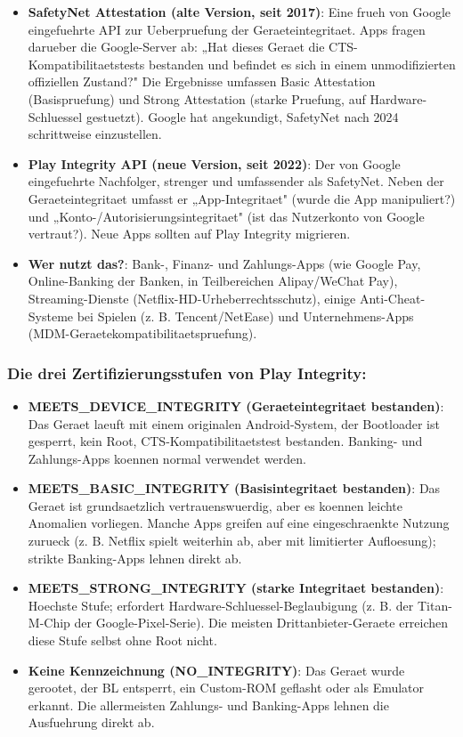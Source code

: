 \begin{itemize}
  \item \textbf{SafetyNet Attestation (alte Version, seit 2017)}: Eine frueh von Google eingefuehrte API zur Ueberpruefung der Geraeteintegritaet. Apps fragen darueber die Google-Server ab: „Hat dieses Geraet die CTS-Kompatibilitaetstests bestanden und befindet es sich in einem unmodifizierten offiziellen Zustand?" Die Ergebnisse umfassen Basic Attestation (Basispruefung) und Strong Attestation (starke Pruefung, auf Hardware-Schluessel gestuetzt). Google hat angekundigt, SafetyNet nach 2024 schrittweise einzustellen.
  \item \textbf{Play Integrity API (neue Version, seit 2022)}: Der von Google eingefuehrte Nachfolger, strenger und umfassender als SafetyNet. Neben der Geraeteintegritaet umfasst er „App-Integritaet" (wurde die App manipuliert?) und „Konto-/Autorisierungsintegritaet" (ist das Nutzerkonto von Google vertraut?). Neue Apps sollten auf Play Integrity migrieren.
  \item \textbf{Wer nutzt das?}: Bank-, Finanz- und Zahlungs-Apps (wie Google Pay, Online-Banking der Banken, in Teilbereichen Alipay/WeChat Pay), Streaming-Dienste (Netflix-HD-Urheberrechtsschutz), einige Anti-Cheat-Systeme bei Spielen (z. B. Tencent/NetEase) und Unternehmens-Apps (MDM-Geraetekompatibilitaetspruefung).
\end{itemize}

\subsubsection*{Die drei Zertifizierungsstufen von Play Integrity:}

\begin{itemize}
  \item \textbf{MEETS\_DEVICE\_INTEGRITY (Geraeteintegritaet bestanden)}: Das Geraet laeuft mit einem originalen Android-System, der Bootloader ist gesperrt, kein Root, CTS-Kompatibilitaetstest bestanden. Banking- und Zahlungs-Apps koennen normal verwendet werden.
  \item \textbf{MEETS\_BASIC\_INTEGRITY (Basisintegritaet bestanden)}: Das Geraet ist grundsaetzlich vertrauenswuerdig, aber es koennen leichte Anomalien vorliegen. Manche Apps greifen auf eine eingeschraenkte Nutzung zurueck (z. B. Netflix spielt weiterhin ab, aber mit limitierter Aufloesung); strikte Banking-Apps lehnen direkt ab.
  \item \textbf{MEETS\_STRONG\_INTEGRITY (starke Integritaet bestanden)}: Hoechste Stufe; erfordert Hardware-Schluessel-Beglaubigung (z. B. der Titan-M-Chip der Google-Pixel-Serie). Die meisten Drittanbieter-Geraete erreichen diese Stufe selbst ohne Root nicht.
  \item \textbf{Keine Kennzeichnung (NO\_INTEGRITY)}: Das Geraet wurde gerootet, der BL entsperrt, ein Custom-ROM geflasht oder als Emulator erkannt. Die allermeisten Zahlungs- und Banking-Apps lehnen die Ausfuehrung direkt ab.
\end{itemize}

